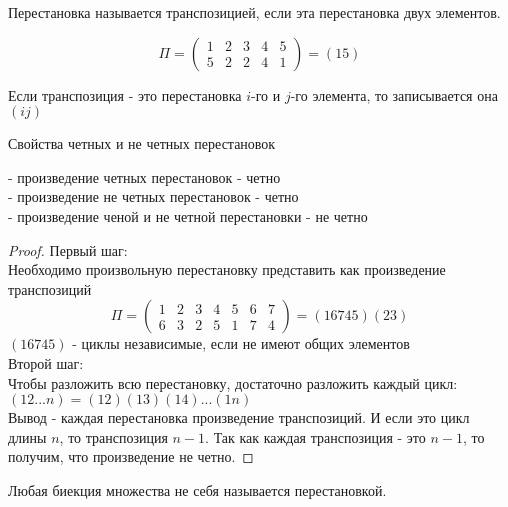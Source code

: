 \begin{defin}
  Перестановка называется транспозицией, если эта перестановка двух элементов.
\end{defin}

  \begin{displaymath}
  \Pi = \left(\begin{array}{lcccr}
  1 & 2 & 3 & 4 & 5\\
  5 & 2 & 2 & 4 & 1
  \end{array}\right) = (15)
  \end{displaymath}

Если транспозиция - это перестановка $i$-го и $j$-го элемента, то записывается
она $(ij)$\\

\begin{title}[\Large]
  Свойства четных и не четных перестановок
\end{title}

 - произведение четных перестановок - четно\\
 - произведение не четных перестановок - четно\\
 - произведение ченой и не четной перестановки - не четно\\

\begin{proof}
  Первый шаг:\\
  Необходимо произвольную перестановку представить как произведение транспозиций
  \begin{displaymath}
  \Pi = \left(\begin{array}{lcccccr}
  1 & 2 & 3 & 4 & 5 & 6 & 7\\
  6 & 3 & 2 & 5 & 1 & 7 & 4
  \end{array}\right) = (16745)(23)
  \end{displaymath}
  $(16745)$ - циклы независимые, если не имеют общих элементов\\

  Второй шаг:\\
  Чтобы разложить всю перестановку, достаточно разложить каждый цикл:\\
  $(12...n) = (12)(13)(14)...(1n)$\\
  Вывод - каждая перестановка произведение транспозиций. И если это цикл длины
  $n$, то транспозиция $n - 1$. Так как каждая транспозиция - это $n - 1$, то
  получим, что произведение не четно.
\end{proof}

\begin{defin}
  Любая биекция множества не себя называется перестановкой.
\end{defin}


